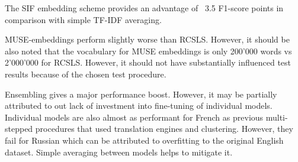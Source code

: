 \documentclass[11pt,a4paper]{article}
\begin{document}
The SIF embedding scheme provides an advantage of ~3.5 F1-score points in comparison with simple TF-IDF averaging.

MUSE-embeddings perform slightly worse than RCSLS. However, it should be also noted that the vocabulary for MUSE embeddings is only 200'000 words vs ~ 2'000'000 for RCSLS. However, it should not have substantially influenced test results because of the chosen test procedure.

Ensembling gives a major performance boost. However, it may be partially attributed to out lack of investment into fine-tuning of individual models. Individual models are also almost as performant for French as previous multi-stepped procedures that used translation engines and clustering. However, they fail for Russian which can be attributed to overfitting to the original English dataset. Simple averaging between models helps to mitigate it.
\end{document}
